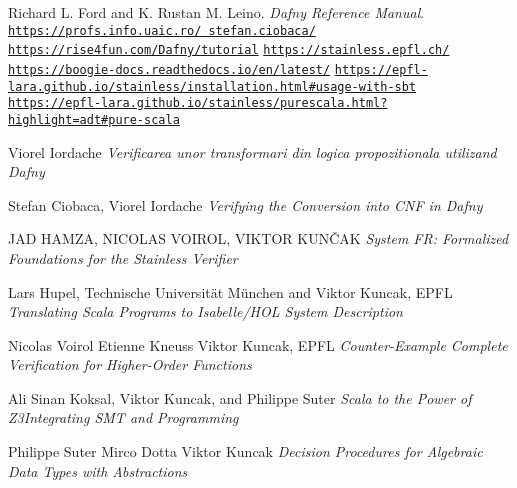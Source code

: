 \begin{thebibliography}{9}
 Richard L. Ford and K. Rustan M. Leino. \textit{Dafny Reference Manual}.
 \texttt{\href{https://profs.info.uaic.ro/~stefan.ciobaca/}{https://profs.info.uaic.ro/~stefan.ciobaca/}}
 \texttt{\href{https://rise4fun.com/Dafny/tutorial}{https://rise4fun.com/Dafny/tutorial}}
 \texttt{\href{https://stainless.epfl.ch/}{https://stainless.epfl.ch/}}
 \texttt{\href{https://boogie-docs.readthedocs.io/en/latest/}{https://boogie-docs.readthedocs.io/en/latest/}}
 {\footnotesize \texttt{\href{https://epfl-lara.github.io/stainless/installation.html\#usage-with-sbt}{https://epfl-lara.github.io/stainless/installation.html\#usage-with-sbt}}}
 {\footnotesize \texttt{\href{https://epfl-lara.github.io/stainless/purescala.html?highlight=adt\#pure-scala}
{https://epfl-lara.github.io/stainless/purescala.html?highlight=adt\#pure-scala}}}



Viorel Iordache
\textit{ Verificarea unor transformari din logica
propozitionala utilizand Dafny}

Stefan Ciobaca,
Viorel Iordache
\textit{Verifying the Conversion into CNF in Dafny}

JAD HAMZA,
NICOLAS VOIROL, 
VIKTOR KUNČAK
\textit{System FR: Formalized Foundations for the Stainless Verifier}

Lars Hupel, Technische Universität München
and Viktor Kuncak, EPFL
\textit{Translating Scala Programs to Isabelle/HOL
System Description}


Nicolas Voirol Etienne Kneuss Viktor Kuncak, EPFL
\textit{Counter-Example Complete Verification
for Higher-Order Functions}


Ali Sinan Koksal, Viktor Kuncak, and Philippe Suter
\textit{Scala to the Power of Z3Integrating SMT and Programming}


Philippe Suter Mirco Dotta Viktor Kuncak
\textit{Decision Procedures for Algebraic
Data Types with Abstractions}

\end{thebibliography}